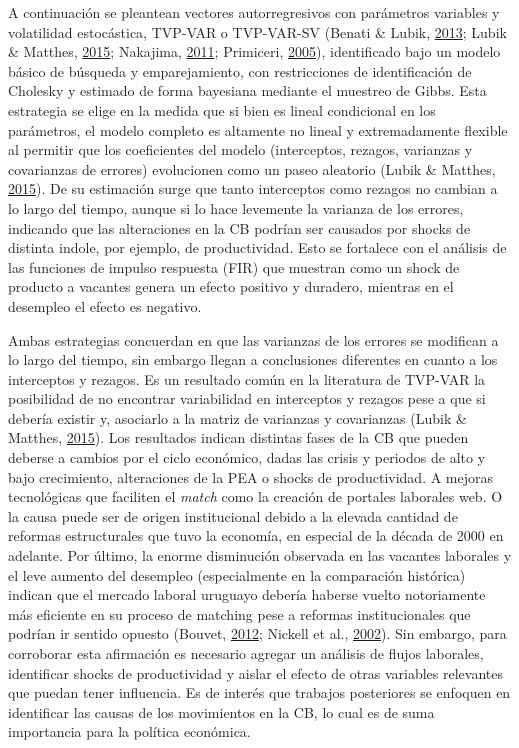 \documentclass[12pt,oneside]{reedthesis}
\begin{document}
A continuación se pleantean vectores autorregresivos con parámetros variables y volatilidad estocástica, TVP-VAR o TVP-VAR-SV (Benati \& Lubik, \protect\hyperlink{ref-Benati2013}{2013}; Lubik \& Matthes, \protect\hyperlink{ref-Lubik2016b}{2015}; Nakajima, \protect\hyperlink{ref-Nakajima2011}{2011}; Primiceri, \protect\hyperlink{ref-Primiceri2005}{2005}), identificado bajo un modelo básico de búsqueda y emparejamiento, con restricciones de identificación de Cholesky y estimado de forma bayesiana mediante el muestreo de Gibbs. Esta estrategia se elige en la medida que si bien es lineal condicional en los parámetros, el modelo completo es altamente no lineal y extremadamente flexible al permitir que los coeficientes del modelo (interceptos, rezagos, varianzas y covarianzas de errores) evolucionen como un paseo aleatorio (Lubik \& Matthes, \protect\hyperlink{ref-Lubik2016b}{2015}). De su estimación surge que tanto interceptos como rezagos no cambian a lo largo del tiempo, aunque si lo hace levemente la varianza de los errores, indicando que las alteraciones en la CB podrían ser causados por shocks de distinta indole, por ejemplo, de productividad. Esto se fortalece con el análisis de las funciones de impulso respuesta (FIR) que muestran como un shock de producto a vacantes genera un efecto positivo y duradero, mientras en el desempleo el efecto es negativo.

Ambas estrategias concuerdan en que las varianzas de los errores se modifican a lo largo del tiempo, sin embargo llegan a conclusiones diferentes en cuanto a los interceptos y rezagos. Es un resultado común en la literatura de TVP-VAR la posibilidad de no encontrar variabilidad en interceptos y rezagos pese a que si debería existir y, asociarlo a la matriz de varianzas y covarianzas (Lubik \& Matthes, \protect\hyperlink{ref-Lubik2016b}{2015}). Los resultados indican distintas fases de la CB que pueden deberse a cambios por el ciclo económico, dadas las crisis y periodos de alto y bajo crecimiento, alteraciones de la PEA o shocks de productividad. A mejoras tecnológicas que faciliten el \emph{match} como la creación de portales laborales web. O la causa puede ser de origen institucional debido a la elevada cantidad de reformas estructurales que tuvo la economía, en especial de la década de 2000 en adelante. Por último, la enorme disminución observada en las vacantes laborales y el leve aumento del desempleo (especialmente en la comparación histórica) indican que el mercado laboral uruguayo debería haberse vuelto notoriamente más eficiente en su proceso de matching pese a reformas institucionales que podrían ir sentido opuesto (Bouvet, \protect\hyperlink{ref-Bouvet2012}{2012}; Nickell et al., \protect\hyperlink{ref-Nickell2002}{2002}). Sin embargo, para corroborar esta afirmación es necesario agregar un análisis de flujos laborales, identificar shocks de productividad y aislar el efecto de otras variables relevantes que puedan tener influencia. Es de interés que trabajos posteriores se enfoquen en identificar las causas de los movimientos en la CB, lo cual es de suma importancia para la política económica.
\end{document}
